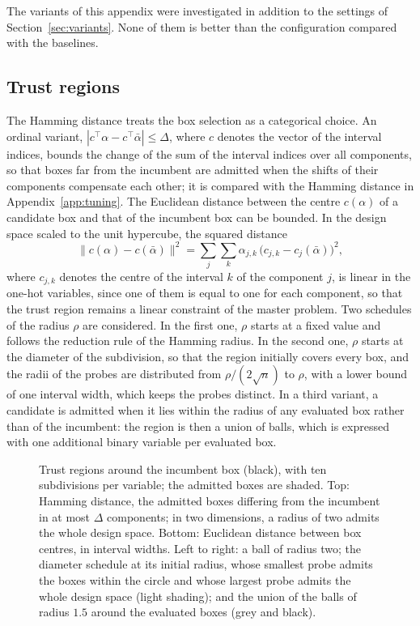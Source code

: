 \documentclass[pdflatex,sn-basic]{sn-jnl}
\newenvironment{appendices}{\appendix}{}
\begin{document}
\begin{appendices}
The variants of this appendix were investigated in addition to the settings of
Section~\ref{sec:variants}. None of them is better than the configuration
compared with the baselines.

\subsection{Trust regions}

The Hamming distance treats the box selection as a categorical choice. An
ordinal variant, $|c^\top\alpha - c^\top\bar\alpha| \le \Delta$, where $c$ denotes
the vector of the interval indices, bounds the change of the sum of the interval
indices over all components, so that boxes far from the incumbent are admitted
when the shifts of their components compensate each other; it is compared with
the Hamming distance in Appendix~\ref{app:tuning}. The Euclidean distance
between the centre $c(\alpha)$ of a candidate box and that of the incumbent box
can be bounded. In the design space scaled to the unit hypercube, the squared
distance
\begin{equation}\label{eq:euclidean}
  \|c(\alpha) - c(\bar\alpha)\|^2
  = \sum_j \sum_k \alpha_{j,k}\,\bigl(c_{j,k} - c_j(\bar\alpha)\bigr)^2,
\end{equation}
where $c_{j,k}$ denotes the centre of the interval $k$ of the component $j$, is
linear in the one-hot variables, since one of them is equal to one for each
component, so that the trust region remains a linear constraint of the master
problem. Two schedules of the radius $\rho$ are considered. In the first one, $\rho$
starts at a fixed value and follows the reduction rule of the Hamming radius. In
the second one, $\rho$ starts at the diameter of the subdivision, so that the region
initially covers every box, and the radii of the probes are distributed from
$\rho/(2\sqrt{n})$ to $\rho$, with a lower bound of one interval width, which keeps the
probes distinct. In a third variant, a candidate is admitted when it lies within
the radius of any evaluated box rather than of the incumbent: the region is then
a union of balls, which is expressed with one additional binary variable per
evaluated box.

\begin{figure}[t]
  \centering
  
  \caption{Trust regions around the incumbent box (black), with ten
    subdivisions per variable; the admitted boxes are shaded. Top: Hamming
    distance, the admitted boxes differing from the incumbent in at most
    $\Delta$ components; in two dimensions, a radius of two admits the whole
    design space. Bottom: Euclidean distance between box centres, in interval
    widths. Left to right: a ball of radius two; the diameter schedule at its
    initial radius, whose smallest probe admits the boxes within the circle and
    whose largest probe admits the whole design space (light shading); and the
    union of the balls of radius $1.5$ around the evaluated boxes (grey and
    black).}
  \label{fig:trust}
\end{figure}


\end{appendices}
\end{document}
